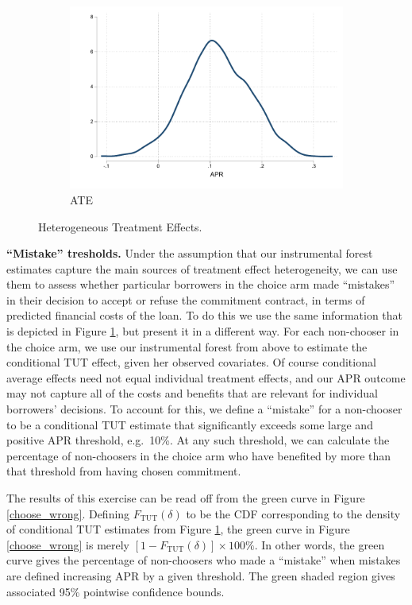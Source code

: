 \documentclass[11pt, a4paper]{article}
\begin{document}
\begin{figure}
\begin{center}
\begin{subfigure}{.32\textwidth}
        \includegraphics[width=\textwidth]{Figuras/he_dist_tau_hat_eff.pdf}
        \caption{ATE}
    \end{subfigure} 
    \end{center}
    \caption{Heterogeneous Treatment Effects.}
    \label{heterogeneous_effects}    
\end{figure}

\vspace{.2in}
\noindent \textbf{``Mistake'' tresholds.} Under the assumption that our instrumental forest estimates capture the main sources of treatment effect heterogeneity, we can use them to assess whether particular borrowers in the choice arm made ``mistakes'' in their decision to accept or refuse the commitment contract, in terms of predicted financial costs of the loan.
To do this we use the same information that is depicted in Figure \ref{heterogeneous_effects}, but present it in a different way.
For each non-chooser in the choice arm, we use our instrumental forest from above to estimate the conditional TUT effect, given her observed covariates.
Of course conditional average effects need not equal individual treatment effects, and our APR outcome may not capture all of the costs and benefits that are relevant for individual borrowers' decisions.
To account for this, we define a ``mistake'' for a non-chooser to be a conditional TUT estimate that significantly exceeds some large and positive APR threshold, e.g.\ 10\%. 
At any such threshold, we can calculate the percentage of non-choosers in the choice arm who have benefited by more than that threshold from having chosen commitment. 


The results of this exercise can be read off from the green curve in Figure \ref{choose_wrong}.
Defining $F_{\text{TUT}}(\delta)$ to be the CDF corresponding to the density of conditional TUT estimates from Figure \ref{heterogeneous_effects}, the green curve in Figure \ref{choose_wrong} is merely $[1 - F_{\text{TUT}}(\delta)] \times 100\%$.
In other words, the green curve gives the percentage of non-choosers who made a ``mistake'' when mistakes are defined increasing APR by a given threshold.
The green shaded region gives associated 95\% pointwise confidence bounds.
\end{document}
